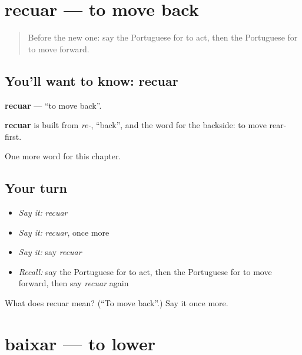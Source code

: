 \section[recuar]{recuar — to move back}

\label{lesson:PT-C179-recuar}



\begin{quote}
Before the new one: say the Portuguese for to act, then the Portuguese for to move forward.
\end{quote}

\subsection*{You'll want to know: recuar}
\textbf{recuar} — \textquotedblleft{}to move back\textquotedblright{}.

\begin{cousinweb}
\textbf{recuar} is built from \emph{re-}, \textquotedblleft{}back\textquotedblright{}, and the word for the backside: to move rear-first.
\end{cousinweb}

\begin{grammarlens}[title={What you've built}]
One more word for this chapter.
\end{grammarlens}

\subsection*{Your turn}
\begin{itemize}
\raggedright
  \item \emph{Say it:} \emph{recuar}
  \item \emph{Say it:} \emph{recuar}, once more
  \item \emph{Say it:} say \emph{recuar}
  \item \emph{Recall:} say the Portuguese for to act, then the Portuguese for to move forward, then say \emph{recuar} again
\end{itemize}

\begin{tcolorbox}[breakable,colback=teal!4,colframe=teal!35!black,title={Before you move on}]
What does recuar mean? (\textquotedblleft{}To move back\textquotedblright{}.) Say it once more.
\end{tcolorbox}
\section[baixar]{baixar — to lower}

